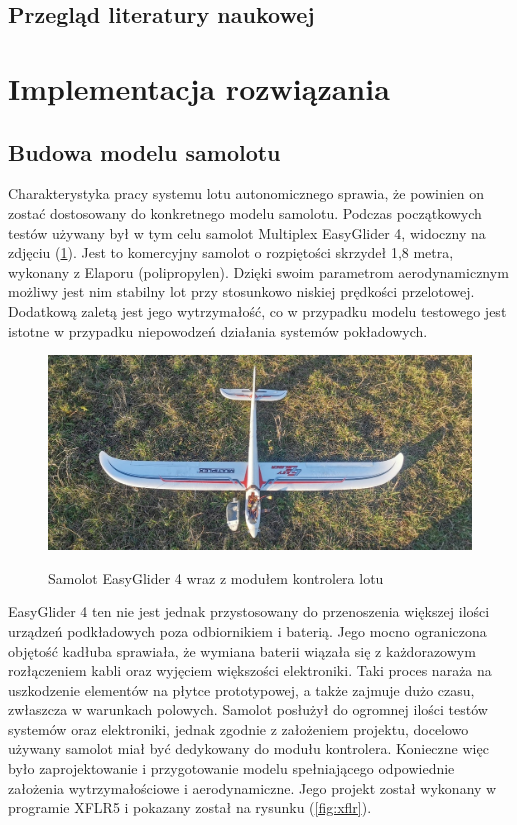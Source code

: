 \documentclass[12pt, a4paper]{article}
\let\oldref\ref
\renewcommand{\ref}[1]{(\oldref{#1})}
\begin{document}
\subsection{Przegląd literatury naukowej}
\clearpage
\section{Implementacja rozwiązania}
\subsection{Budowa modelu samolotu}
Charakterystyka pracy systemu lotu autonomicznego sprawia, że powinien  on zostać dostosowany do konkretnego modelu samolotu. Podczas początkowych testów używany był w tym celu samolot Multiplex EasyGlider 4, widoczny na zdjęciu \ref{fig:eg4}. Jest to komercyjny samolot o rozpiętości skrzydeł 1,8 metra, wykonany z Elaporu (polipropylen). Dzięki swoim parametrom aerodynamicznym możliwy jest nim stabilny lot przy stosunkowo niskiej prędkości przelotowej. Dodatkową zaletą jest jego wytrzymałość, co w przypadku modelu testowego jest istotne w przypadku niepowodzeń działania systemów pokładowych.

\begin{figure}[ht]
    \centering
    \includegraphics[width=1\textwidth]{budowa1}\\
    \label{fig:eg4}
    \caption{Samolot EasyGlider 4 wraz z modułem kontrolera lotu}
\end{figure}

EasyGlider 4 ten nie jest jednak przystosowany do przenoszenia większej ilości urządzeń podkładowych poza odbiornikiem i baterią. Jego mocno ograniczona objętość kadłuba sprawiała, że wymiana baterii wiązała się z każdorazowym rozłączeniem kabli oraz wyjęciem większości elektroniki. Taki proces naraża na uszkodzenie elementów na płytce prototypowej, a także zajmuje dużo czasu, zwłaszcza w warunkach polowych. Samolot posłużył do ogromnej ilości testów systemów oraz elektroniki, jednak zgodnie z założeniem projektu, docelowo używany samolot miał być dedykowany do modułu kontrolera. Konieczne więc było zaprojektowanie i przygotowanie modelu spełniającego odpowiednie założenia wytrzymałościowe i aerodynamiczne. Jego projekt został wykonany w programie XFLR5 i pokazany został na rysunku \ref{fig:xflr}.
\end{document}
